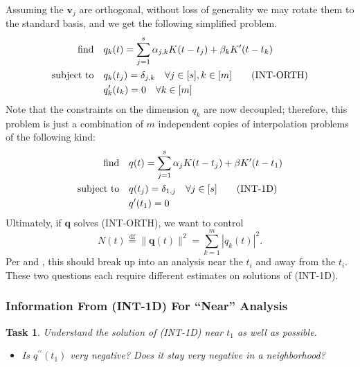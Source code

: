 \documentclass[11pt]{article}
\newcommand{\HS}{\hspace{3.5mm}}
\newcommand{\eqdf}{\stackrel{\mathrm{df}}{=}}
\newcommand{\bv}{\bm v}
\newcommand{\bq}{\bm q}
\newtheorem{task}{Task}
\begin{document}
Assuming the $\bv_j$ are orthogonal, without loss of generality we may rotate them to the standard basis, and we get the following simplified problem.
\begin{align*}
  \text{find} &\HS q_k(t) = \sum_{j = 1}^s \alpha_{j, k} K(t - t_j) + \beta_kK^\prime(t - t_k) \\
  \text{subject to} &\HS q_k(t_j) = \delta_{j, k} \HS \forall j \in [s], k \in [m] \tag{\text{INT-ORTH}} \\
                  &\HS q_k^\prime(t_k) = 0 \HS \forall k \in [m]
\end{align*}
Note that the constraints on the dimension $q_k$ are now decoupled; therefore, this problem is just a combination of $m$ independent copies of interpolation problems of the following kind:
\begin{align*}
  \text{find} &\HS q(t) = \sum_{j = 1}^{s} \alpha_j K(t - t_j) + \beta K^\prime(t - t_1) \\
  \text{subject to}
              &\HS q(t_j) = \delta_{1,j} \HS \forall j \in [s] \tag{\text{INT-1D}} \\
              &\HS q^\prime(t_1) = 0
\end{align*}
Ultimately, if $\bq$ solves (INT-ORTH), we want to control
\[ N(t) \eqdf \|\bq(t)\|^2 = \sum_{k = 1}^m |q_k(t)|^2. \]
Per \cite{fernandez2016super} and \cite{tang2013compressed}, this should break up into an analysis near the $t_i$ and away from the $t_i$.
These two questions each require different estimates on solutions of (INT-1D).

\subsubsection{Information From (INT-1D) For ``Near'' Analysis}

\begin{task}
    Understand the solution of (INT-1D) near $t_1$ as well as possible.
    \begin{itemize}
    \item Is $q^{\prime\prime}(t_1)$ very negative? Does it stay very negative in a neighborhood?
    \end{itemize}
\end{task}
\end{document}
